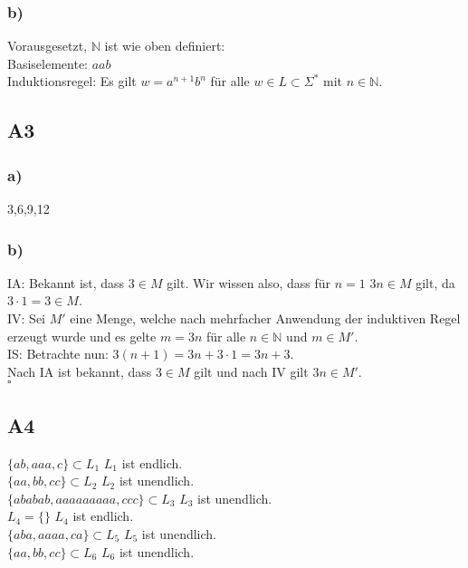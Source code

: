 \documentclass[12pt, a4paper]{article}
\newcommand*{\qed}{\null\nobreak\hfill\ensuremath{\square}}
\newcommand*{\puffer}{\text{ }\text{ }\text{ }\text{ }}
\newcommand*{\gap}{\text{ }}
\begin{document}
\subsubsection*{b)}
Vorausgesetzt, $\mathbb{N}$ ist wie oben definiert:\\
Basiselemente: $aab$\\
Induktionsregel: Es gilt $w=a^{n+1}b^{n}$ für alle $w \in L \subset \Sigma ^{*} $ mit $n \in \mathbb{N}$.
\subsection*{A3}
\subsubsection*{a)}
3,6,9,12
\subsubsection*{b)}
IA: Bekannt ist, dass $3 \in M$ gilt. Wir wissen also, dass für $n = 1$ $3n \in M$ gilt, da $3 \cdot 1 = 3 \in M$.\\
IV: Sei $M'$ eine Menge, welche nach mehrfacher Anwendung der induktiven Regel erzeugt wurde und es gelte $m = 3n$ für alle $n \in \mathbb{N}$ und $m \in M'$.\\
IS: Betrachte nun: $3(n+1) = 3n + 3 \cdot 1 = 3n + 3$.\\
Nach IA ist bekannt, dass $3 \in M$ gilt und nach IV gilt $3n \in M'$.\\
\qed
\subsection*{A4}
$\{ ab, aaa, c \} \subset L_1$ \puffer \puffer \puffer \puffer \puffer \puffer \gap $L_1$ ist endlich.\\
$\{ aa, bb, cc \} \subset L_2$ \puffer \puffer \puffer \puffer \puffer \puffer \gap \gap $L_2$ ist unendlich.\\
$\{ ababab, aaaaaaaaa, ccc\} \subset L_3$ \puffer \puffer $L_3$ ist unendlich.\\
$L_4 = \{ \}$ \puffer \puffer \puffer \puffer \puffer \puffer \puffer \puffer \puffer \gap $L_4$ ist endlich.\\
$\{ aba, aaaa, ca \} \subset L_5$ \puffer \puffer \puffer \puffer \puffer $L_5$ ist unendlich.\\
$\{ aa, bb, cc \} \subset L_6$ \puffer \puffer \puffer \puffer \puffer \puffer \gap $L_6$ ist unendlich.\\
\end{document}
